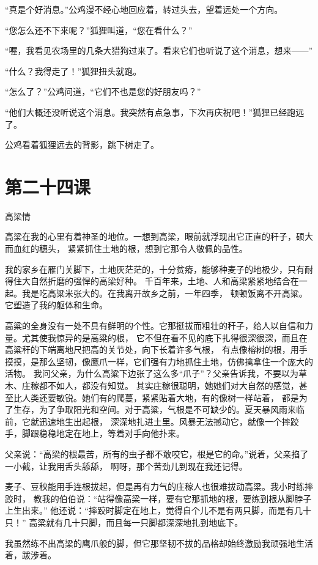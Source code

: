 \documentclass[12pt,UTF8]{ctexbook}
\begin{document}
“真是个好消息。”公鸡漫不经心地回应着，转过头去，望着远处一个方向。

“您怎么还不下来呢？”狐狸叫道，“您在看什么？”

“喔，我看见农场里的几条大猎狗过来了。看来它们也听说了这个消息，想来——”

“什么？我得走了！”狐狸扭头就跑。

“怎么了？”公鸡问道，“它们不也是您的好朋友吗？”

“他们大概还没听说这个消息。我突然有点急事，下次再庆祝吧！”狐狸已经跑远了。

公鸡看着狐狸远去的背影，跳下树走了。

\section{第二十四课}

高梁情

高梁在我的心里有着神圣的地位。一想到高梁，眼前就浮现出它正直的秆子，硕大而血红的穗头，
紧紧抓住土地的根，想到它那令人敬佩的品性。

我的家乡在雁门关脚下，土地灰茫茫的，十分贫瘠，能够种麦子的地极少，只有耐得住大自然折磨的强悍的高梁好种。
千百年来，土地、人和高梁紧紧地结合在一起。我是吃高粱米张大的。在我离开故乡之前，一年四季，
顿顿饭离不开高粱。它塑造了我的躯体和生命。

高粱的全身没有一处不具有鲜明的个性。它那挺拔而粗壮的秆子，给人以自信和力量。尤其使我惊异的是高粱的根，
它不但在看不见的底下扎得很深很深，而且在高粱秆的下端离地尺把高的关节处，向下长着许多气根，
有点像榕树的根，用手摸摸，是那么坚韧，像鹰爪一样，它们强有力地抓住土地，仿佛擒拿住一个庞大的活物。
我问父亲，为什么高粱下边张了这么多“爪子”？父亲告诉我，不要以为草木、庄稼都不如人，都没有知觉。
其实庄稼很聪明，她她们对大自然的感觉，甚至比人类还要敏锐。她们有的爬蔓，紧紧贴着大地，有的像树一样站着，
都是为了生存，为了争取阳光和空间。对于高粱，气根是不可缺少的。夏天暴风雨来临前，它就迅速地生出起根，
深深地扎进土里。风暴无法撼动它，就像一个摔跤手，脚跟稳稳地定在地上，等着对手向他扑来。

父亲说：“高梁的根最苦，所有的虫子都不敢咬它，根是它的命。”说着，父亲掐了一小截，让我用舌头舔舔，
啊呀，那个苦劲儿到现在我还记得。

麦子、豆秧能用手连根拔起，但是再有力气的庄稼人也很难拔动高梁。我小时练摔跤时，
教我的伯伯说：“站得像高梁一样，要有它那抓地的根，要练到根从脚脖子上生出来。”
他还说：“摔跤时脚定在地上，觉得自个儿不是有两只脚，而是有几十只！”
高梁就有几十只脚，而且每一只脚都深深地扎到地底下。

我虽然练不出高梁的鹰爪般的脚，但它那坚韧不拔的品格却始终激励我顽强地生活着，跋涉着。
\end{document}
